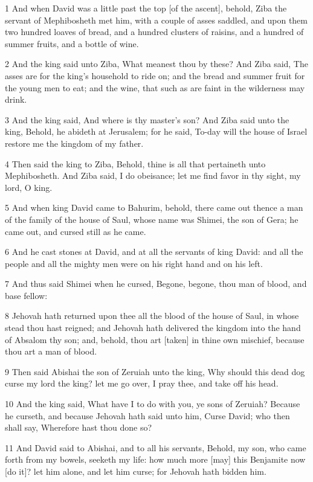 \par 1 And when David was a little past the top [of the ascent], behold, Ziba the servant of Mephibosheth met him, with a couple of asses saddled, and upon them two hundred loaves of bread, and a hundred clusters of raisins, and a hundred of summer fruits, and a bottle of wine.
\par 2 And the king said unto Ziba, What meanest thou by these? And Ziba said, The asses are for the king's household to ride on; and the bread and summer fruit for the young men to eat; and the wine, that such as are faint in the wilderness may drink.
\par 3 And the king said, And where is thy master's son? And Ziba said unto the king, Behold, he abideth at Jerusalem; for he said, To-day will the house of Israel restore me the kingdom of my father.
\par 4 Then said the king to Ziba, Behold, thine is all that pertaineth unto Mephibosheth. And Ziba said, I do obeisance; let me find favor in thy sight, my lord, O king.
\par 5 And when king David came to Bahurim, behold, there came out thence a man of the family of the house of Saul, whose name was Shimei, the son of Gera; he came out, and cursed still as he came.
\par 6 And he cast stones at David, and at all the servants of king David: and all the people and all the mighty men were on his right hand and on his left.
\par 7 And thus said Shimei when he cursed, Begone, begone, thou man of blood, and base fellow:
\par 8 Jehovah hath returned upon thee all the blood of the house of Saul, in whose stead thou hast reigned; and Jehovah hath delivered the kingdom into the hand of Absalom thy son; and, behold, thou art [taken] in thine own mischief, because thou art a man of blood.
\par 9 Then said Abishai the son of Zeruiah unto the king, Why should this dead dog curse my lord the king? let me go over, I pray thee, and take off his head.
\par 10 And the king said, What have I to do with you, ye sons of Zeruiah? Because he curseth, and because Jehovah hath said unto him, Curse David; who then shall say, Wherefore hast thou done so?
\par 11 And David said to Abishai, and to all his servants, Behold, my son, who came forth from my bowels, seeketh my life: how much more [may] this Benjamite now [do it]? let him alone, and let him curse; for Jehovah hath bidden him.
